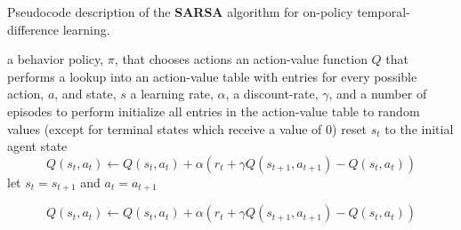 \documentclass[xcolor={table}]{beamer}
\newcommand{\keyword}[1]{{\textbf{#1}}\index{#1}}
\begin{document}
\begin{frame}[plain]
\scriptsize{Pseudocode description of the \keyword{SARSA} algorithm for on-policy temporal-difference learning.}

\begin{footnotesize}
\begin{algorithmic}[1]
\Require a behavior policy, $\pi$, that chooses actions
\Require an action-value function $Q$ that performs a lookup into an action-value table with entries for every possible action, $a$, and state, $s$
\Require a learning rate, $\alpha$, a discount-rate, $\gamma$, and a number of episodes to perform
\State initialize all entries in the action-value table to random values (except for terminal states which receive a value of $0$)
\label{alg_ln:sarsa_intialise_q_table}
\State reset $s_t$ to the initial agent state
\label{alg_ln:sarsa_intialise_agent_state}
\label{alg_ln:sarsa_choose_first_action}
\Repeat
\label{alg_ln:sarsa_action_loop}
       \label{alg_ln:sarsa_take_action}
        \label{alg_ln:sarsa_choose_next_action}
      \label{alg_ln:sarsa_update_q_value}
    \begin{equation*}
    {Q}\left(s_t, a_t\right) \leftarrow {Q}\left(s_t, a_t\right) + \alpha\left(r_t + \gamma{Q}\left(s_{t+1}, a_{t+1}\right) - {Q}\left(s_t, a_t\right)\right)
    \label{eqn:sarsa_update_q_value}
     \end{equation*}
     \State let $s_{t} = s_{t+1}$ and $a_{t} = a_{t+1}$
     \label{alg_ln:ql_update_state_and_action}
\EndFor
\end{algorithmic}
\end{footnotesize}
\end{frame}


 \begin{frame} 
    \begin{equation*}
    {Q}\left(s_t, a_t\right) \leftarrow {Q}\left(s_t, a_t\right) + \alpha\left(r_t + \gamma{Q}\left(s_{t+1}, a_{t+1}\right) - {Q}\left(s_t, a_t\right)\right)
    \label{eqn:sarsa_update_q_value}
     \end{equation*}
\end{frame} 
\end{document}
